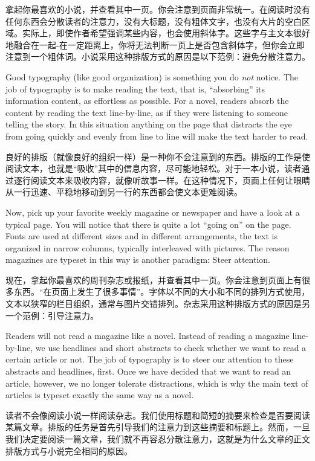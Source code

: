 拿起你最喜欢的小说，并查看其中一页。你会注意到页面非常统一。在阅读时没有任何东西会分散读者的注意力，没有大标题，没有粗体文字，也没有大片的空白区域。实际上，即使作者希望强调某些内容，也会使用斜体字。这些字与主文本很好地融合在一起-在一定距离上，你将无法判断一页上是否包含斜体字，但你会立即注意到一个粗体词。小说采用这种排版方式的原因是以下范例：避免分散注意力。

Good typography (like good organization) is something you do \emph{not} notice.
The job of typography is to make reading the text, that is, ``absorbing'' its
information content, as effortless as possible. For a novel, readers absorb the
content by reading the text line-by-line, as if they were listening to someone
telling the story. In this situation anything on the page that distracts the
eye from  going quickly and evenly from line to line will make the text harder
to read.

良好的排版（就像良好的组织一样）是一种你不会注意到的东西。排版的工作是使阅读文本，也就是“吸收”其中的信息内容，尽可能地轻松。对于一本小说，读者通过逐行阅读文本来吸收内容，就像听故事一样。在这种情况下，页面上任何让眼睛从一行迅速、平稳地移动到另一行的东西都会使文本更难阅读。

Now, pick up your favorite weekly magazine or newspaper and have a look at a
typical page. You will notice that there is quite a lot ``going on'' on the
page. Fonts are used at different sizes and in different arrangements, the text
is organized in narrow columns, typically interleaved with pictures. The reason
magazines are typeset in this way is another paradigm: Steer attention.

现在，拿起你最喜欢的周刊杂志或报纸，并查看其中一页。你会注意到页面上有很多东西。“在页面上发生了很多事情”。字体以不同的大小和不同的排列方式使用，文本以狭窄的栏目组织，通常与图片交错排列。杂志采用这种排版方式的原因是另一个范例：引导注意力。

Readers will not read a magazine like a novel. Instead of reading a magazine
line-by-line, we use headlines and short abstracts to check whether we want to
read a certain article or not. The job of typography is to steer our attention
to these abstracts and headlines, first. Once we have decided that we want to
read an article, however, we no longer tolerate distractions, which is why the
main text of articles is typeset exactly the same way as a novel.

读者不会像阅读小说一样阅读杂志。我们使用标题和简短的摘要来检查是否要阅读某篇文章。排版的任务是首先引导我们的注意力到这些摘要和标题上。然而，一旦我们决定要阅读一篇文章，我们就不再容忍分散注意力，这就是为什么文章的正文排版方式与小说完全相同的原因。

